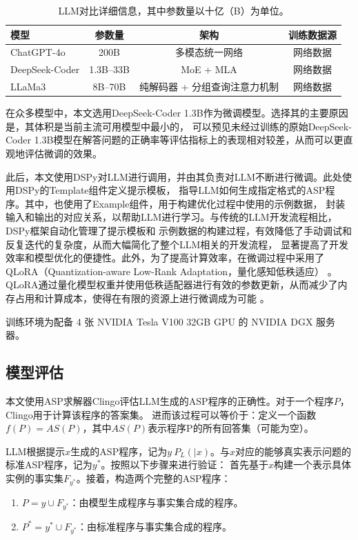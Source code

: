 \begin{table}[ht]
    \centering
    \begin{tabular}{lccc}
        \toprule
        \textbf{模型} & \textbf{参数量} & \textbf{架构} & \textbf{训练数据源} \\
        \midrule
        ChatGPT-4o    & 200B      & 多模态统一网络           & 网络数据         \\
        DeepSeek-Coder       & 1.3B--33B      & MoE + MLA            & 网络数据    \\
        LLaMa3         & 8B--70B   & 纯解码器 + 分组查询注意力机制   & 网络数据         \\
        \bottomrule
    \end{tabular}
    \caption{LLM对比详细信息，其中参数量以十亿（B）为单位。}
    \label{tab:llm-comparison}
\end{table}

在众多模型中，本文选用DeepSeek-Coder 1.3B作为微调模型。选择其的主要原因是，其体积是当前主流可用模型中最小的，
可以预见未经过训练的原始DeepSeek-Coder 1.3B模型在解答问题的正确率等评估指标上的表现相对较差，从而可以更直观地评估微调的效果。

此后，本文使用DSPy对LLM进行调用，并由其负责对LLM不断进行微调。此处使用DSPy的Template组件定义提示模板，
指导LLM如何生成指定格式的ASP程序。其中，也使用了Example组件，用于构建优化过程中使用的示例数据，
封装输入和输出的对应关系，以帮助LLM进行学习。与传统的LLM开发流程相比，DSPy框架自动化管理了提示模板和
示例数据的构建过程，有效降低了手动调试和反复迭代的复杂度，从而大幅简化了整个LLM相关的开发流程，
显著提高了开发效率和模型优化的便捷性。此外，为了提高计算效率，在微调过程中采用了QLoRA（Quantization-aware Low-Rank Adaptation，量化感知低秩适应） 。
QLoRA通过量化模型权重并使用低秩适配器进行有效的参数更新，从而减少了内存占用和计算成本，使得在有限的资源上进行微调成为可能 。

训练环境为配备 4 张 NVIDIA Tesla V100 32GB GPU 的 NVIDIA DGX 服务器。
\subsection{模型评估}
本文使用ASP求解器Clingo评估LLM生成的ASP程序的正确性。对于一个程序$P$，Clingo用于计算该程序的答案集。
进而该过程可以等价于：定义一个函数$f(P) = AS(P)$，其中$AS(P)$表示程序P的所有回答集（可能为空）。

LLM根据提示$x$生成的ASP程序，记为$y ~ P_L(|x)$。与$x$对应的能够真实表示问题的标准ASP程序，记为$y^*$。按照以下步骤来进行验证：
首先基于$x$构建一个表示具体实例的事实集$F_{y^*}$。接着，构造两个完整的ASP程序：
\begin{enumerate}[itemsep=0pt,parsep=0pt]
\item $P = y \cup F_{y^*}$：由模型生成程序与事实集合成的程序。
\item $P^* = y^* \cup F_{y^*}$：由标准程序与事实集合成的程序。
\end{enumerate}


